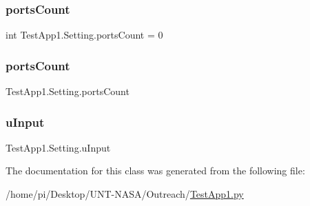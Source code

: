 \subsubsection{\texorpdfstring{ports\+Count}{portsCount}\hspace{0.1cm}{\footnotesize\ttfamily [1/2]}}
{\footnotesize\ttfamily int Test\+App1.\+Setting.\+ports\+Count = 0\hspace{0.3cm}{\ttfamily [static]}}

\mbox{\label{classTestApp1_1_1Setting_a2136b22973822bf1b2881f357439d362}} 
\subsubsection{\texorpdfstring{ports\+Count}{portsCount}\hspace{0.1cm}{\footnotesize\ttfamily [2/2]}}
{\footnotesize\ttfamily Test\+App1.\+Setting.\+ports\+Count}

\mbox{\label{classTestApp1_1_1Setting_afc9d6674bdc5d0684fee6149b9c0f419}} 
\subsubsection{\texorpdfstring{u\+Input}{uInput}}
{\footnotesize\ttfamily Test\+App1.\+Setting.\+u\+Input}



The documentation for this class was generated from the following file\+:\begin{DoxyCompactItemize}
\item 
/home/pi/\+Desktop/\+U\+N\+T-\/\+N\+A\+S\+A/\+Outreach/\hyperlink{Outreach_2TestApp1_8py}{Test\+App1.\+py}\end{DoxyCompactItemize}
